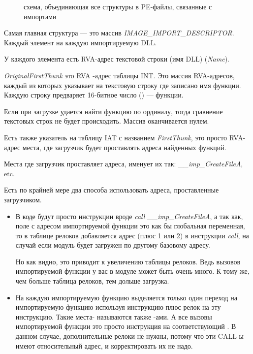 \begin{figure}[H]
\centering
{}
\caption{схема, объединяющая все структуры в PE-файлы, связанные с импортами}
\end{figure}

Самая главная структура --- это массив \emph{IMAGE\_IMPORT\_DESCRIPTOR}.
Каждый элемент на каждую импортируемую DLL.

У каждого элемента есть \ac{RVA}-адрес текстовой строки (имя DLL) (\emph{Name}).

\emph{OriginalFirstThunk} это \ac{RVA} -адрес таблицы \ac{INT}.
Это массив \ac{RVA}-адресов, каждый из которых указывает на текстовую строку где записано имя функции. 
Каждую строку предваряет 16-битное число () ---  функции.

Если при загрузке удается найти функцию по ординалу, тогда сравнение текстовых строк не будет происходить.
Массив оканчивается нулем.

Есть также указатель на таблицу \ac{IAT} с названием \emph{FirstThunk}, это просто \ac{RVA}-адрес места, где загрузчик будет проставлять адреса найденных функций.

Места где загрузчик проставляет адреса, \IDA именует их так: \emph{\_\_imp\_CreateFileA}, etc.

Есть по крайней мере два способа использовать адреса, проставленные загрузчиком.

\begin{itemize}
\item
В коде будут просто инструкции вроде \emph{call \_\_imp\_CreateFileA}, а так как, поле с адресом импортируемой функции это как бы глобальная переменная, 
то в таблице релоков добавляется адрес (плюс 1 или 2) в инструкции \emph{call},
на случай если модуль будет загружен по другому базовому адресу.

Но как видно, это приводит к увеличению таблицы релоков.
Ведь вызовов импортируемой функции у вас в модуле может быть очень много.
К тому же, чем больше таблица релоков, тем дольше загрузка.

\item
На каждую импортируемую функцию выделяется только один переход на импортируемую функцию используя
инструкцию \JMP плюс релок на эту инструкцию.
Такие места- называются также -ами.
А все вызовы импортируемой функции это просто инструкция \CALL на соответствующий .
В данном случае, дополнительные релоки не нужны, потому что эти CALL-ы имеют относительный адрес,
и корректировать их не надо.
\end{itemize}


